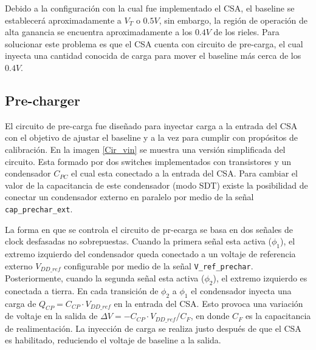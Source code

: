  Debido a la configuración con la cual fue implementado el CSA, el baseline se establecerá aproximadamente a $V_T$ o $0.5V$, sin embargo, la región de operación de alta ganancia se encuentra aproximadamente a los $0.4V$ de los rieles. Para solucionar este problema es que el CSA cuenta con circuito de pre-carga, el cual inyecta una cantidad conocida de carga para mover el baseline más cerca de los $0.4V$.
 

\subsection{Pre-charger}


El circuito de pre-carga fue diseñado para inyectar carga a la entrada del CSA con el objetivo de ajustar el baseline y a la vez para cumplir con propósitos de calibración.
 En la imagen \ref{Cir_vin} se muestra una versión simplificada del circuito. Esta formado por dos switches implementados con transistores y un condensador $C_{PC}$ el cual esta conectado a la entrada del CSA. Para cambiar el valor de la capacitancia de este condensador (modo SDT) existe la posibilidad de conectar un condensador externo en paralelo por medio de la señal \verb+cap_prechar_ext+.
 
 
La forma en que se controla el circuito de pr-ecarga se basa en dos señales de clock desfasadas no sobrepuestas. Cuando la primera señal esta activa ($\phi_1$), el extremo izquierdo del condensador queda conectado a un voltaje de referencia externo $V_{DD\_ref}$ configurable por medio de la señal \verb+V_ref_prechar+. Posteriormente, cuando la segunda señal esta activa ($\phi_2$), el extremo izquierdo es conectada a tierra. En cada transición de $\phi_2$ a $\phi_1$ el condensador inyecta una carga de $Q_{CP}=C_{CP} \cdot V_{DD\_ref}$ en la entrada del CSA. Esto provoca una variación de voltaje en la salida de $\Delta V =-C_{CP} \cdot V_{DD\_ref}/C_F$, en donde $C_F$ es la capacitancia de realimentación. La inyección de carga se realiza justo después de que el CSA es habilitado, reduciendo el voltaje de baseline a la salida. 

